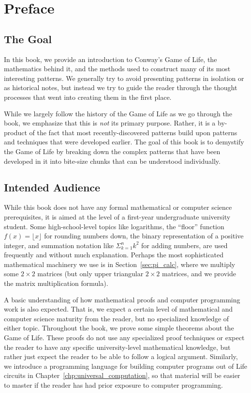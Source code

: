 \renewcommand{\chapterfolder}{preface/}
\chapter{Preface}


\section*{The Goal}

In this book, we provide an introduction to Conway's Game of Life, the mathematics behind it, and the methods used to construct many of its most interesting patterns. We generally try to avoid presenting patterns in isolation or as historical notes, but instead we try to guide the reader through the thought processes that went into creating them in the first place.

While we largely follow the history of the Game of Life as we go through the book, we emphasize that this is \emph{not} its primary purpose. Rather, it is a by-product of the fact that most recently-discovered patterns build upon patterns and techniques that were developed earlier. The goal of this book is to demystify the Game of Life by breaking down the complex patterns that have been developed in it into bite-size chunks that can be understood individually.


\section*{Intended Audience}

While this book does not have any formal mathematical or computer science prerequisites, it is aimed at the level of a first-year undergraduate university student. Some high-school-level topics like logarithms, the ``floor'' function $f(x) = \lfloor x \rfloor$ for rounding numbers down, the binary representation of a positive integer, and summation notation like $\Sigma_{k=1}^n k^2$ for adding numbers, are used frequently and without much explanation. Perhaps the most sophisticated mathematical machinery we use is in Section~\ref{sec:pi_calc}, where we multiply some $2 \times 2$ matrices (but only upper triangular $2 \times 2$ matrices, and we provide the matrix multiplication formula).

A basic understanding of how mathematical proofs and computer programming work is also expected. That is, we expect a certain level of mathematical and computer science maturity from the reader, but no specialized knowledge of either topic. Throughout the book, we prove some simple theorems about the Game of Life. These proofs do not use any specialized proof techniques or expect the reader to have any specific university-level mathematical knowledge, but rather just expect the reader to be able to follow a logical argument. Similarly, we introduce a programming language for building computer programs out of Life circuits in Chapter~\ref{chp:universal_computation}, so that material will be easier to master if the reader has had prior exposure to computer programming.

